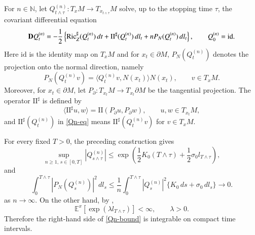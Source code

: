 \documentclass[11pt,twoside, reqno]{article}
\def\mathpal#1{\mathop{\mathchoice{\text{\rm #1}}%
   {\text{\rm #1}}{\text{\rm #1}}%
   {\text{\rm #1}}}\nolimits}
\newcommand\Ric{\mathpal{Ric}}
\newcommand\1{\mathbbm{1}}
\newcommand\II{\mathrm{II}}
\theoremstyle{definition}
\numberwithin{equation}{section}
\begin{document}
For $n\in\mathbb N$, let
$Q_{t\wedge\tau}^{(n)}:T_xM\to T_{x_{t\wedge\tau}}M$ solve, up to the
stopping time $\tau$, the covariant differential equation
\begin{equation}\label{Qn-eq}
        {\bf D}Q_t^{(n)}
        =-\frac12\left\{
        \Ric_Z^\sharp(Q_t^{(n)})\,dt
        +\II^\sharp(Q_t^{(n)})\,dl_t
        +nP_N(Q_t^{(n)})\,dl_t
        \right\},
        \qquad
        Q_0^{(n)}=\mathrm{id}.
\end{equation}
Here $\mathrm{id}$ is the identity map on $T_xM$ and for $x_t\in\partial M$,
$P_N(Q_t^{(n)})$ denotes the projection onto the normal
direction, namely
\[
        P_N(Q_t^{(n)}v)
        =\langle Q_t^{(n)}v,N(x_t)\rangle N(x_t),
        \qquad v\in T_xM.
\]
Moreover, for $x_t\in\partial M$, let
$P_\partial:T_{x_t}M\to T_{x_t}\partial M$ be the tangential projection. The
operator $\II^\sharp$ is defined by
\[
        \langle \II^\sharp u,w\rangle
        =\II(P_\partial u,P_\partial w),
        \qquad u,w\in T_{x_t}M,
\]
and $\II^\sharp(Q_t^{(n)})$ in \eqref{Qn-eq} means
$\II^\sharp(Q_t^{(n)}v)$ for $v\in T_xM$.

For every fixed \(T>0\), the preceding construction gives
\begin{equation}\label{Qn-bound}
        \sup_{n\geq1,\,s\in[0,T]}
        |Q_{s\wedge\tau}^{(n)}|
        \leq
        \exp\left(
        \frac12K_0(T\wedge\tau)
        +
        \frac12\sigma_0l_{T\wedge\tau}
        \right),
\end{equation}
and
\begin{equation}\label{normal-vanish}
        \int_0^{T\wedge\tau}
        |P_N(Q_s^{(n)})|^2\,dl_s
        \leq
        \frac1n
        \int_0^{T\wedge\tau}
        |Q_s^{(n)}|^2
        \{K_0\,ds+\sigma_0\,dl_s\}
        \longrightarrow0 .
\end{equation}
as $n\to\infty$. On the other hand, by \cite[Lemma~3.1.2]{Wbook14},
\[
        \mathbb E^x\left[\exp\left(\lambda l_{T\wedge\tau}\right)\right]<\infty,
        \qquad \lambda>0.
\]
Therefore the right-hand side of \eqref{Qn-bound} is integrable on compact
time intervals.
\end{document}

